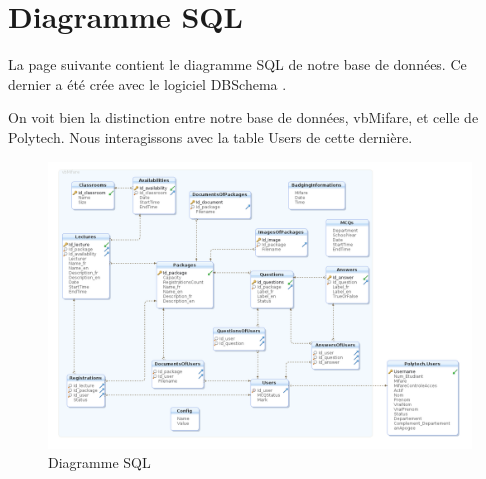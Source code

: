 \chapter{Diagramme SQL}

La page suivante contient le diagramme SQL de notre base de données. Ce dernier
a été crée avec le logiciel DBSchema \cite{dbschema}.

On voit bien la distinction entre notre base de données, vbMifare, et celle de
Polytech. Nous interagissons avec la table Users de cette dernière.

    \begin{figure}[h]
        \begin{center}
            \includegraphics[angle=90, scale=0.54]{images/sql.png} 
        \end{center}

        \caption{Diagramme SQL}
        \label{Diagramme SQL}
    \end{figure}
